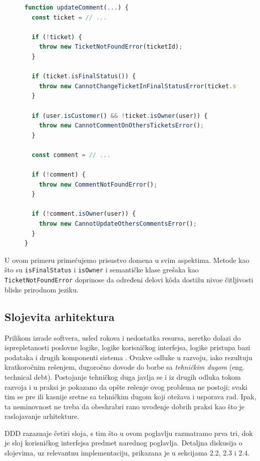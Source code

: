 \documentclass[12pt,oneside]{memoir}
\begin{document}
\begin{figure}[h]
\begin{lstlisting}[language=JavaScript, style=ES6, caption={K\^{o}d koji je na domenskom jeziku}]
function updateComment(...) {
  const ticket = // ...

  if (!ticket) {
    throw new TicketNotFoundError(ticketId);
  }

  if (ticket.isFinalStatus()) {
    throw new CannotChangeTicketInFinalStatusError(ticket.status);
  }

  if (user.isCustomer() && !ticket.isOwner(user)) {
    throw new CannotCommentOnOthersTicketsError();
  }

  const comment = // ...

  if (!comment) {
    throw new CommentNotFoundError();
  }

  if (!comment.isOwner(user)) {
    throw new CannotUpdateOthersCommentsError();
  }
}
\end{lstlisting}
\end{figure}

\newpage
U ovom primeru primećujemo prisustvo domena u svim aspektima. Metode kao što su \verb|isFinalStatus| i \verb|isOwner| i semantičke klase grešaka kao \verb|TicketNotFoundError| doprinose da određeni delovi k\^{o}da dostižu nivoe čitljivosti bliske prirodnom jeziku.

\subsection{Slojevita arhitektura}
Prilikom izrade softvera, usled rokova i nedostatka resursa, neretko dolazi do isprepletanosti poslovne logike, logike korisničkog interfejsa, logike pristupa bazi podataka i drugih komponenti sistema \cite{dddfull}. Ovakve odluke u razvoju, iako rezultuju kratkoročnim rešenjem, dugoročno dovode do borbe sa \textit{tehničkim dugom} (eng. technical debt). Postojanje tehničkog duga javlja se i iz drugih odluka tokom razvoja i u praksi je pokazano da opšte rešenje ovog problema ne postoji; svaki tim se pre ili kasnije sretne sa tehničkim dugom koji otežava i usporava rad. Ipak, ta neminovnost ne treba da obeshrabri rano uvođenje dobrih praksi kao što je raslojavanje arhitekture. 

DDD razaznaje četiri sloja, s tim što u ovom poglavlju razmatramo prva tri, dok je sloj korisničkog interfejsa predmet narednog poglavlja. Detaljna diskusija o slojevima, uz relevantnu implementaciju, prikazana je u sekcijama 2.2, 2.3 i 2.4.
\end{document}
